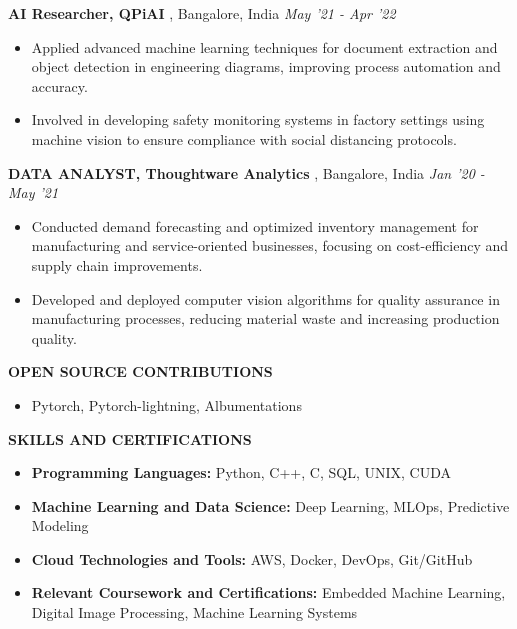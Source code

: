 \documentclass[10pt,a4]{article}
\begin{document}
{\begin{flushleft}
		\textbf{\large AI Researcher, QPiAI }, \large Bangalore, India \hfill \textit{\large May '21 - Apr '22}	\\
		\begin{itemize}
			  
			\item Applied advanced machine learning techniques for document extraction and object detection in engineering diagrams, improving process automation and accuracy.
			\item Involved in developing safety monitoring systems in factory settings using machine vision to ensure compliance with social distancing protocols.
        \end{itemize}		

		\textbf{\large DATA ANALYST, Thoughtware Analytics }, \large Bangalore, India \hfill \textit{\large Jan '20 - May '21}	\\		
		\begin{itemize}
			  
			\item Conducted demand forecasting and optimized inventory management for manufacturing and service-oriented businesses, focusing on cost-efficiency and supply chain improvements.
			\item Developed and deployed computer vision algorithms for quality assurance in manufacturing processes, reducing material waste and increasing production quality.   
        \end{itemize}	

        \textbf{\large OPEN SOURCE CONTRIBUTIONS}
        \begin{itemize}
            \item Pytorch, Pytorch-lightning, Albumentations
        \end{itemize}
\end{flushleft}



\begin{flushleft}
    {\Large \textbf {SKILLS AND CERTIFICATIONS}}
    
        \vspace{1mm}
        \begin{itemize}
            \item \large \textbf{Programming Languages:} Python, C++, C, SQL, UNIX, CUDA \\
            \item \large \textbf{Machine Learning and Data Science:} Deep Learning, MLOps, Predictive Modeling   \\
            \item \large \textbf{Cloud Technologies and Tools:} AWS, Docker, DevOps, Git/GitHub \\
            \item \large \textbf{Relevant Coursework and Certifications:} Embedded Machine Learning, Digital Image Processing, Machine Learning Systems \\
        

\end{itemize}
\end{flushleft}}
\end{document}
